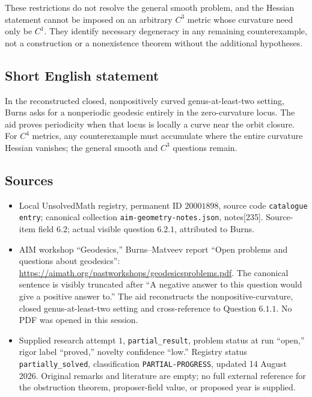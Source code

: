 \documentclass[11pt]{article}
\begin{document}
These restrictions do not resolve the general smooth problem, and the Hessian statement cannot be imposed on an arbitrary \(C^3\) metric whose curvature need only be \(C^1\). They identify necessary degeneracy in any remaining counterexample, not a construction or a nonexistence theorem without the additional hypotheses.
\subsection{Short English statement}
In the reconstructed closed, nonpositively curved genus-at-least-two setting, Burns asks for a nonperiodic geodesic entirely in the zero-curvature locus. The aid proves periodicity when that locus is locally a curve near the orbit closure. For \(C^4\) metrics, any counterexample must accumulate where the entire curvature Hessian vanishes; the general smooth and \(C^3\) questions remain.
\subsection{Sources}
\begin{itemize}
\item Local UnsolvedMath registry, permanent ID \(20001898\), source code \texttt{catalogue entry}; canonical collection \texttt{aim-geometry-notes.json}, notes[235]. Source-item field \(6.2\); actual visible question \(6.2.1\), attributed to Burns.
\item AIM workshop ``Geodesics,'' Burns--Matveev report ``Open problems and questions about geodesics'': \url{https://aimath.org/pastworkshops/geodesicsproblems.pdf}. The canonical sentence is visibly truncated after ``A negative answer to this question would give a positive answer to.'' The aid reconstructs the nonpositive-curvature, closed genus-at-least-two setting and cross-reference to Question \(6.1.1\). No PDF was opened in this session.
\item Supplied research attempt \(1\), \texttt{partial\_result}, problem status at run ``open,'' rigor label ``proved,'' novelty confidence ``low.'' Registry status \texttt{partially\_solved}, classification \texttt{PARTIAL-PROGRESS}, updated 14 August 2026. Original remarks and literature are empty; no full external reference for the obstruction theorem, proposer-field value, or proposed year is supplied.
\end{itemize}
\end{document}
